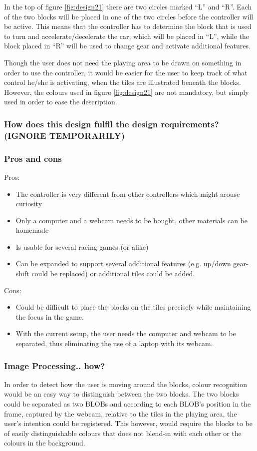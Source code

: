 In the top of figure \ref{fig:design21} there are two circles marked “L” and “R”. Each of the two blocks will be placed in one of the two circles before the controller will be active. This means that the controller has to determine the block that is used to turn and accelerate/decelerate the car, which will be placed in “L”, while the block placed in “R” will be used to change gear and activate additional features.

Though the user does not need the playing area to be drawn on something in order to use the controller, it would be easier for the user to keep track of what control he/she is activating, when the tiles are illustrated beneath the blocks. However, the colours used in figure \ref{fig:design21} are not mandatory, but simply used in order to ease the description.

\subsubsection*{How does this design fulfil the design requirements? (IGNORE TEMPORARILY)}

\subsubsection*{Pros and cons}
Pros:
\begin{itemize}
\item The controller is very different from other controllers which might arouse curiosity
\item Only a computer and a webcam needs to be bought, other materials can be homemade
\item Is usable for several racing games (or alike)
\item Can be expanded to support several additional features (e.g. up/down gear-shift could be replaced) or additional tiles could be added.
\end{itemize}
Cons:
\begin{itemize}
\item Could be difficult to place the blocks on the tiles precisely while maintaining the focus in the game.
\item With the current setup, the user needs the computer and webcam to be separated, thus eliminating the use of a laptop with its webcam.
\end{itemize}

\subsubsection*{Image Processing.. how?}
In order to detect how the user is moving around the blocks, colour recognition would be an easy way to distinguish between the two blocks. The two blocks could be separated as two BLOBs and according to each BLOB’s position in the frame, captured by the webcam, relative to the tiles in the playing area, the user’s intention could be registered. This however, would require the blocks to be of easily distinguishable colours that does not blend-in with each other or the colours in the background.